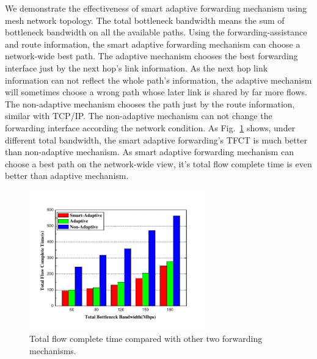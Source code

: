 We demonstrate the effectiveness of smart adaptive forwarding mechanism using mesh network topology. The total bottleneck bandwidth means the sum of bottleneck bandwidth on all the available paths. Using the forwarding-assistance and route information, the smart adaptive forwarding mechanism can choose a network-wide best path. The adaptive mechanism chooses the best forwarding interface just by the next hop's link information. As the next hop link information can not reflect the whole path's information, the adaptive mechanism will sometimes choose a wrong path whose later link is shared by far more flows. The non-adaptive mechanism chooses the path just by the route information, similar with TCP/IP. The non-adaptive mechanism can not change the forwarding interface according the network condition. As Fig.~\ref{fig-tfct} shows, under different total bandwidth, the smart adaptive forwarding's TFCT is much better than non-adaptive mechanism. As smart adaptive forwarding mechanism can choose a best path on the network-wide view, it's total flow complete time is even better than adaptive mechanism.

\begin{figure}[t]
\centering
\includegraphics[width=3in]{adaptive-pic.pdf}
\caption{Total flow complete time compared with other two forwarding mechanisms.}
\label{fig-tfct}
\end{figure}

